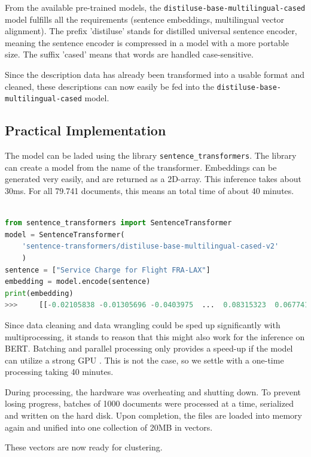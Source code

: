             From the available pre-trained models, the \lstinline|distiluse-base-multilingual-cased| model fulfills all the requirements (sentence embeddings, multilingual vector alignment). The prefix 'distiluse' stands for distilled universal sentence encoder, meaning the sentence encoder is compressed in a model with a more portable size. The suffix 'cased' means that words are handled case-sensitive.
            
            Since the description data has already been transformed into a usable format and cleaned, these descriptions can now easily be fed into the \lstinline|distiluse-base-multilingual-cased| model.
            	
            \subsection{Practical Implementation}
             
             The model can be laded using the library \lstinline|sentence_transformers|. The library can create a model from the name of the transformer. Embeddings can be generated very easily, and are returned as a 2D-array. This inference takes about 30ms. For all 79.741 documents, this means an total time of about 40 minutes.
             
\begin{lstlisting}[language=python,
	label=code:process-pool,
	caption=Generating an Embedding with BERT,
	style=EigenerPythonStyle]   

from sentence_transformers import SentenceTransformer
model = SentenceTransformer(
	'sentence-transformers/distiluse-base-multilingual-cased-v2'
	)
sentence = ["Service Charge for Flight FRA-LAX"]
embedding = model.encode(sentence)
print(embedding)
>>> 	[[-0.02105838 -0.01305696 -0.0403975  ...  0.08315323  0.06774105  0.03354893]
\end{lstlisting}

		Since data cleaning and data wrangling could be sped up significantly with multiprocessing, it stands to reason that this might also work for the inference on BERT. Batching and parallel processing only provides a speed-up if the model can utilize a strong \ac{GPU} \cite{schopfParallelInferenceHuggingFace2022}. This is not the case, so we settle with a one-time processing taking 40 minutes.
		
		During processing, the hardware was overheating and shutting down. To prevent losing progress, batches of 1000 documents were processed at a time, serialized and written on the hard disk. Upon completion, the files are loaded into memory again and unified into one collection of 20MB in vectors.

		These vectors are now ready for clustering.            